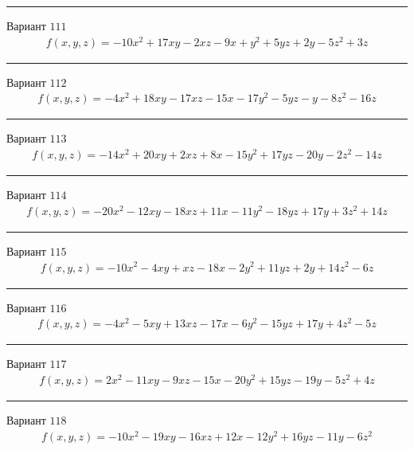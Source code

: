 \documentclass[11pt]{report}
\begin{document}
\begin{center}
\noindent\rule{8cm}{0.4pt}
\end{center}
Вариант $111$
\begin{align*}
    f(x, y, z) = - 10 x^{2} + 17 x y - 2 x z - 9 x + y^{2} + 5 y z + 2 y - 5 z^{2} + 3 z
\end{align*}
\begin{center}
\noindent\rule{8cm}{0.4pt}
\end{center}
Вариант $112$
\begin{align*}
    f(x, y, z) = - 4 x^{2} + 18 x y - 17 x z - 15 x - 17 y^{2} - 5 y z - y - 8 z^{2} - 16 z
\end{align*}
\begin{center}
\noindent\rule{8cm}{0.4pt}
\end{center}
Вариант $113$
\begin{align*}
    f(x, y, z) = - 14 x^{2} + 20 x y + 2 x z + 8 x - 15 y^{2} + 17 y z - 20 y - 2 z^{2} - 14 z
\end{align*}
\begin{center}
\noindent\rule{8cm}{0.4pt}
\end{center}
Вариант $114$
\begin{align*}
    f(x, y, z) = - 20 x^{2} - 12 x y - 18 x z + 11 x - 11 y^{2} - 18 y z + 17 y + 3 z^{2} + 14 z
\end{align*}
\begin{center}
\noindent\rule{8cm}{0.4pt}
\end{center}
Вариант $115$
\begin{align*}
    f(x, y, z) = - 10 x^{2} - 4 x y + x z - 18 x - 2 y^{2} + 11 y z + 2 y + 14 z^{2} - 6 z
\end{align*}
\begin{center}
\noindent\rule{8cm}{0.4pt}
\end{center}
Вариант $116$
\begin{align*}
    f(x, y, z) = - 4 x^{2} - 5 x y + 13 x z - 17 x - 6 y^{2} - 15 y z + 17 y + 4 z^{2} - 5 z
\end{align*}
\begin{center}
\noindent\rule{8cm}{0.4pt}
\end{center}
Вариант $117$
\begin{align*}
    f(x, y, z) = 2 x^{2} - 11 x y - 9 x z - 15 x - 20 y^{2} + 15 y z - 19 y - 5 z^{2} + 4 z
\end{align*}
\begin{center}
\noindent\rule{8cm}{0.4pt}
\end{center}
Вариант $118$
\begin{align*}
    f(x, y, z) = - 10 x^{2} - 19 x y - 16 x z + 12 x - 12 y^{2} + 16 y z - 11 y - 6 z^{2}
\end{align*}
\end{document}
